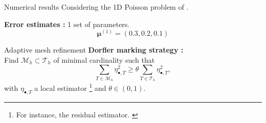 \begin{appendixframe}{Numerical results}
	Considering the 1D Poisson problem of .

	\textbf{Error estimates :} 1 set of parameters.
		$$\bm{\mu}^{(1)}=(0.3,0.2,0.1) $$
		
		\vspace{-15pt}
		\begin{figure}[H]
	\end{figure}
\end{appendixframe}


\begin{subappendixframe}{Adaptive mesh refinement}
	\textbf{Dorfler marking strategy :} \citep{dorfler_1996} \\
	Find $\mathcal{M}_h \subset \mathcal{T}_h$ of minimal cardinality such that
	\begin{equation*}
		\sum_{T \in \mathcal{M}_h} \eta_{\bullet,T}^2 \geq \theta \sum_{T \in \mathcal{T}_h} \eta_{\bullet,T}^2,
	\end{equation*}
	with $\eta_{\bullet,T}$ a local estimator \footnote[frame,1]{For instance, the residual estimator. \citep{ainsworth_posteriori_1997}}
	and $\theta \in (0,1)$.
\end{subappendixframe}